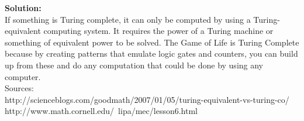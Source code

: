 \documentclass[12pt,letterpaper]{exam}
\begin{document}
\begin{questions}
\begin{itemize}
\textbf{Solution:}\\
If something is Turing complete, it can only be computed by using a Turing-equivalent computing system. It requires the power of a Turing machine or something of equivalent power to be solved. The Game of Life is Turing Complete because by creating patterns that emulate logic gates and counters, you can build up from these and do any computation that could be done by using any computer.\\

Sources:\\
http://scienceblogs.com/goodmath/2007/01/05/turing-equivalent-vs-turing-co/\\
http://www.math.cornell.edu/~lipa/mec/lesson6.html


\end{itemize}



\end{questions}
\end{document}
